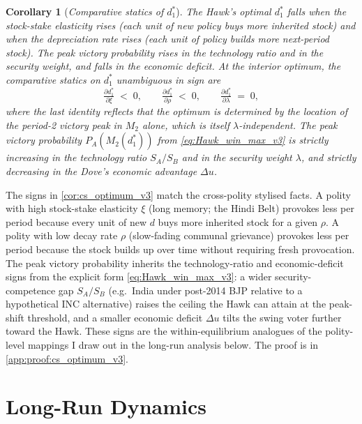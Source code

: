 \documentclass[11pt,twoside]{extarticle}
\newtheorem{corollary}{Corollary}
\begin{document}
\begin{corollary}[\emph{Comparative statics of $d_1^*$}]\label{cor:cs_optimum_v3}
\emph{The Hawk's optimal $d_1^*$ falls when the stock-stake elasticity rises (each unit of new policy buys more inherited stock) and when the depreciation rate rises (each unit of policy builds more next-period stock). The peak victory probability rises in the technology ratio and in the security weight, and falls in the economic deficit.}
At the interior optimum, the comparative statics on $d_1^*$ unambiguous in sign are
\begin{equation}\label{eq:cs_d1_v3}
    \tfrac{\partial d_1^*}{\partial \xi}\;<\;0,\qquad \tfrac{\partial d_1^*}{\partial \rho}\;<\;0,\qquad \tfrac{\partial d_1^*}{\partial \lambda}\;=\;0,
\end{equation}
where the last identity reflects that the optimum is determined by the location of the period-2 victory peak in $M_2$ alone, which is itself $\lambda$-independent. The peak victory probability $P_A(M_2(d_1^*))$ from \autoref{eq:Hawk_win_max_v3} is strictly increasing in the technology ratio $S_A/S_B$ and in the security weight $\lambda$, and strictly decreasing in the Dove's economic advantage $\Delta u$.
\end{corollary}

The signs in \autoref{cor:cs_optimum_v3} match the cross-polity stylised facts. A polity with high stock-stake elasticity $\xi$ (long memory; the Hindi Belt) provokes less per period because every unit of new $d$ buys more inherited stock for a given $\rho$. A polity with low decay rate $\rho$ (slow-fading communal grievance) provokes less per period because the stock builds up over time without requiring fresh provocation. The peak victory probability inherits the technology-ratio and economic-deficit signs from the explicit form \autoref{eq:Hawk_win_max_v3}: a wider security-competence gap $S_A/S_B$ (e.g.\ India under post-2014 BJP relative to a hypothetical INC alternative) raises the ceiling the Hawk can attain at the peak-shift threshold, and a smaller economic deficit $\Delta u$ tilts the swing voter further toward the Hawk. These signs are the within-equilibrium analogues of the polity-level mappings I draw out in the long-run analysis below. The proof is in \autoref{app:proof:cs_optimum_v3}.

\section{Long-Run Dynamics}\label{sec:dynamics_v3}
\end{document}
